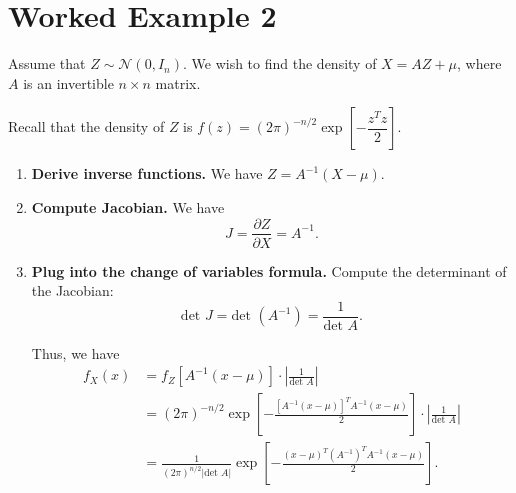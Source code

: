 \documentclass{article}
\newcommand{\calN}{\mathcal{N}}
\newcommand{\pd}{\partial}
\begin{document}
\section*{Worked Example 2}
Assume that $Z \sim \calN(0, I_n)$. We wish to find the density of $X = AZ + \mu$, where $A$ is an invertible $n \times n$ matrix.

Recall that the density of $Z$ is $f(z) = (2\pi)^{-n/2} \exp \left[ -\dfrac{z^Tz}{2}\right]$.

\begin{enumerate}
\item \textbf{Derive inverse functions.} We have $Z = A^{-1}(X-\mu)$.

\item \textbf{Compute Jacobian.} We have
\begin{equation*}
J = \frac{\pd Z}{\pd X} = A^{-1}.
\end{equation*}

\item \textbf{Plug into the change of variables formula.} Compute the determinant of the Jacobian:
\begin{equation*}
\text{det } J = \text{det } (A^{-1}) = \frac{1}{\text{det } A}.
\end{equation*}

Thus, we have
\begin{align*}
f_X (x) &= f_Z[A^{-1}(x-\mu)] \cdot \left| \frac{1}{\text{det } A} \right| \\ 
&= (2\pi)^{-n/2} \exp \left[ -\frac{[A^{-1}(x-\mu)]^T A^{-1}(x-\mu)}{2}\right] \cdot \left| \frac{1}{\text{det } A} \right| \\ 
&= \frac{1}{(2\pi)^{n/2} |\text{det } A|} \exp \left[ -\frac{(x-\mu)^T (A^{-1})^T A^{-1}(x-\mu)}{2}\right].
\end{align*}

\end{enumerate}
\end{document}
